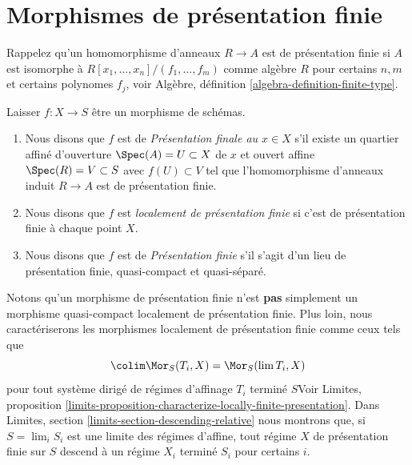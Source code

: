 \section{Morphismes de présentation finie}
\label{section-finite-presentation}

\noindent
Rappelez qu'un homomorphisme d'anneaux $R \to A$ est de présentation finie si $A$ est isomorphe à $R[x_1, \ldots, x_n]/(f_1, \ldots, f_m)$ comme algèbre $R$ pour certains $n, m$ et certains polynomes $f_j$, voir Algèbre, définition \ref{algebra-definition-finite-type}.

\begin{definition}

\label{definition-finite-presentation}

Laisser $f : X \to S$ être un morphisme de schémas.

\begin{enumerate}

\item Nous disons que $f$ est de {\it Présentation finale au $x \in X$} s'il existe un quartier affiné d'ouverture $\Spec(A) = U \subset X$
de $x$ et ouvert affine $\Spec(R) = V \subset S$
avec $f(U) \subset V$ tel que l'homomorphisme d'anneaux induit
$R \to A$ est de présentation finie.
\item Nous disons que $f$ est {\it localement de présentation finie} si c'est de présentation finie à chaque point $X$.
\item Nous disons que $f$ est de {\it Présentation finie} s'il s'agit d'un lieu de présentation finie, quasi-compact et quasi-séparé.

\end{enumerate}

\end{definition}\noindent Notons qu'un morphisme de présentation finie n'est {\bf pas} simplement un morphisme quasi-compact localement de présentation finie. Plus loin, nous caractériserons les morphismes localement de présentation finie comme ceux tels que $$
\colim \Mor_S(T_i, X) = \Mor_S(\lim T_i, X)
$$
pour tout système dirigé de régimes d'affinage $T_i$ terminé $S$Voir Limites, proposition \ref{limits-proposition-characterize-locally-finite-presentation}. Dans Limites, section \ref{limits-section-descending-relative} nous montrons que, si $S = \lim_i S_i$ est une limite des régimes d'affine, tout régime $X$ de présentation finie sur $S$ descend à un régime
$X_i$ terminé $S_i$ pour certains $i$.

